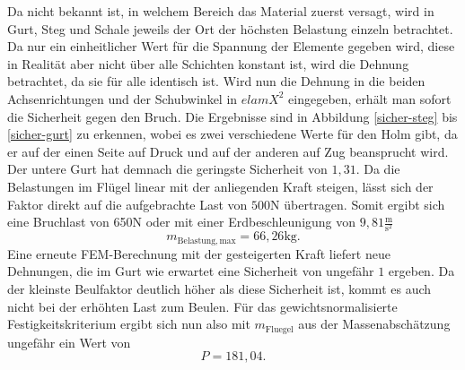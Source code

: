 \noindent Da nicht bekannt ist, in welchem Bereich das Material zuerst versagt, wird in Gurt, Steg und Schale jeweils der Ort der höchsten Belastung einzeln betrachtet. Da nur ein einheitlicher Wert für die Spannung der Elemente gegeben wird, diese in Realität aber nicht über alle Schichten konstant ist, wird die Dehnung betrachtet, da sie für alle identisch ist. Wird nun die Dehnung in die beiden Achsenrichtungen und der Schubwinkel in $elamX^{2}$ eingegeben, erhält man sofort die Sicherheit gegen den Bruch. Die Ergebnisse sind in Abbildung \ref{sicher-steg} bis \ref{sicher-gurt} zu erkennen, wobei es zwei verschiedene Werte für den Holm gibt, da er auf der einen Seite auf Druck und auf der anderen auf Zug beansprucht wird. Der untere Gurt hat demnach die geringste Sicherheit von $1,31$. Da die Belastungen im Flügel linear mit der anliegenden Kraft steigen, lässt sich der Faktor direkt auf die aufgebrachte Last von $500\mathrm{N}$ übertragen. Somit ergibt sich eine Bruchlast von 650N oder mit einer Erdbeschleunigung von $9,81\frac{\mathrm{m}}{\mathrm{s^2}}$
$$m_{\mathrm{Belastung,max}} = 66,26\mathrm{kg}. $$ Eine erneute FEM-Berechnung mit der gesteigerten Kraft liefert neue Dehnungen, die im Gurt wie erwartet eine Sicherheit von ungefähr $1$ ergeben. Da der kleinste Beulfaktor deutlich höher als diese Sicherheit ist, kommt es auch nicht bei der erhöhten Last zum Beulen.
Für das gewichtsnormalisierte Festigkeitskriterium ergibt sich nun also mit $m_{\mathrm{Fluegel}}$ aus der Massenabschätzung ungefähr ein Wert von
$$P = 181,04.$$
